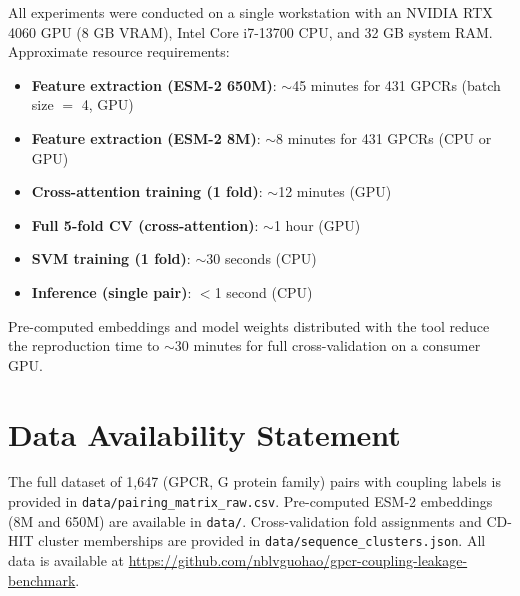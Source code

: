 \documentclass[11pt,a4paper]{article}
\begin{document}
All experiments were conducted on a single workstation with an NVIDIA RTX 4060 GPU (8 GB VRAM), Intel Core i7-13700 CPU, and 32 GB system RAM. Approximate resource requirements:

\begin{itemize}
  \item \textbf{Feature extraction (ESM-2 650M)}: $\sim$45 minutes for 431 GPCRs (batch size $=$ 4, GPU)
  \item \textbf{Feature extraction (ESM-2 8M)}: $\sim$8 minutes for 431 GPCRs (CPU or GPU)
  \item \textbf{Cross-attention training (1 fold)}: $\sim$12 minutes (GPU)
  \item \textbf{Full 5-fold CV (cross-attention)}: $\sim$1 hour (GPU)
  \item \textbf{SVM training (1 fold)}: $\sim$30 seconds (CPU)
  \item \textbf{Inference (single pair)}: $<$1 second (CPU)
\end{itemize}

Pre-computed embeddings and model weights distributed with the tool reduce the reproduction time to $\sim$30 minutes for full cross-validation on a consumer GPU.

\section{Data Availability Statement}

The full dataset of 1,647 (GPCR, G protein family) pairs with coupling labels is provided in \texttt{data/pairing\_matrix\_raw.csv}. Pre-computed ESM-2 embeddings (8M and 650M) are available in \texttt{data/}. Cross-validation fold assignments and CD-HIT cluster memberships are provided in \texttt{data/sequence\_clusters.json}. All data is available at \url{https://github.com/nblvguohao/gpcr-coupling-leakage-benchmark}.
\end{document}
